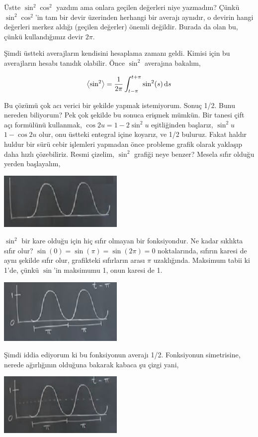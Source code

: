 \documentclass[12pt,fleqn]{article}\usepackage{../../common}
\begin{document}
Üstte $\sin^2\cos^2$ yazdım ama onlara geçilen değerleri niye yazmadım? Çünkü
$\sin^2\cos^2$'in tam bir devir üzerinden herhangi bir averajı aynıdır, o
devirin hangi değerleri merkez aldığı (geçilen değerler) önemli değildir. Burada
da olan bu, çünkü kullandığımız devir $2\pi$.

Şimdi üstteki averajların kendisini hesaplama zamanı geldi. Kimisi için bu
averajların hesabı tanıdık olabilir. Önce $\sin^2$ averajına bakalım,

$$
\bigl \langle \sin^2 \bigr\rangle  =
\frac{1}{2\pi} \int_{t-\pi}^{t+\pi} \sin^2 (s) \,\mathrm{d} s
$$

Bu çözümü çok acı verici bir şekilde yapmak istemiyorum. Sonuç 1/2. Bunu nereden
biliyorum? Pek çok şekilde bu sonuca erişmek mümkün. Bir tanesi çift açı
formülünü kullanmak, $\cos 2u = 1-2\sin^2 u$ eşitliğinden başlarız, $\sin^2 u$
$1-\cos 2u$ olur, onu üstteki entegral içine koyarız, ve 1/2 buluruz. Fakat
haldır huldur bir sürü cebir işlemleri yapmadan önce probleme grafik olarak
yaklaşıp daha hızlı çözebiliriz. Resmi çizelim, $\sin^2$ grafiği neye benzer?
Mesela sıfır olduğu yerden başlayalım,

\includegraphics[width=6cm]{11_01.png}
 
$\sin^2$ bir kare olduğu için hiç sıfır olmayan bir fonksiyondur. Ne kadar
sıklıkta sıfır olur? $\sin(0)=\sin(\pi)=\sin(2\pi)=0$ noktalarında, sıfırın
karesi de aynı şekilde sıfır olur, grafikteki sıfırların arası $\pi$
uzaklığında. Maksimum tabii ki 1'de, çünkü $\sin$'in maksimumu 1, onun karesi de
1.

\includegraphics[width=6cm]{11_02.png}
 
Şimdi iddia ediyorum ki bu fonksiyonun averajı 1/2. Fonksiyonun simetrisine,
nerede ağırlığının olduğuna bakarak kabaca şu çizgi yani,

\includegraphics[width=6cm]{11_03.png}
\end{document}
